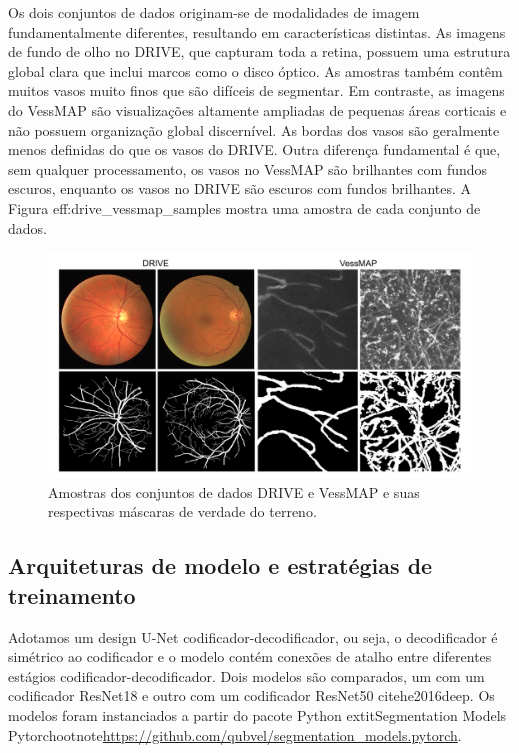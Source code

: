 \documentclass[%
reprint,
nofootinbib,
 amsmath,amssymb,
aps,
superscriptaddress,
showkeys,
longbibliography
]{revtex4-1}
\begin{document}
Os dois conjuntos de dados originam-se de modalidades de imagem fundamentalmente diferentes, resultando em características distintas. As imagens de fundo de olho no DRIVE, que capturam toda a retina, possuem uma estrutura global clara que inclui marcos como o disco óptico. As amostras também contêm muitos vasos muito finos que são difíceis de segmentar. Em contraste, as imagens do VessMAP são visualizações altamente ampliadas de pequenas áreas corticais e não possuem organização global discernível. As bordas dos vasos são geralmente menos definidas do que os vasos do DRIVE. Outra diferença fundamental é que, sem qualquer processamento, os vasos no VessMAP são brilhantes com fundos escuros, enquanto os vasos no DRIVE são escuros com fundos brilhantes. A Figura 
ef{f:drive_vessmap_samples} mostra uma amostra de cada conjunto de dados.

\begin{figure}[tbp]
    \centering
    \includegraphics[width=\columnwidth]{figures/results/drive_vessmap_samples.pdf}
    \caption{Amostras dos conjuntos de dados DRIVE e VessMAP e suas respectivas máscaras de verdade do terreno.}
    \label{f:drive_vessmap_samples}
\end{figure}

\subsection{Arquiteturas de modelo e estratégias de treinamento}

Adotamos um design U-Net codificador-decodificador, ou seja, o decodificador é simétrico ao codificador e o modelo contém conexões de atalho entre diferentes estágios codificador-decodificador. Dois modelos são comparados, um com um codificador ResNet18 e outro com um codificador ResNet50 
cite{he2016deep}. Os modelos foram instanciados a partir do pacote Python 	extit{Segmentation Models Pytorch}\ootnote{\url{https://github.com/qubvel/segmentation_models.pytorch}}.
\end{document}
